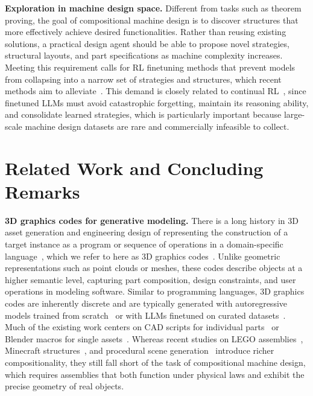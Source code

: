 \documentclass{article} %
\theoremstyle{plain}
\theoremstyle{definition}
\begin{document}
\textbf{Exploration in machine design space.} Different from tasks such as theorem proving, the goal of compositional machine design is to discover structures that more effectively achieve desired functionalities. Rather than reusing existing solutions, a practical design agent should be able to propose novel strategies, structural layouts, and part specifications as machine complexity increases. Meeting this requirement calls for RL finetuning methods that prevent models from collapsing into a narrow set of strategies and structures, which recent methods aim to alleviate~\citep{zhu2025flowrl,chen2025pass, cui2025entropy,cheng2025reasoning,liu2025nablagfn}. This demand is closely related to continual RL~\citep{schwarz2018progress}, since finetuned LLMs must avoid catastrophic forgetting, maintain its reasoning ability, and consolidate learned strategies, which is particularly important because large-scale machine design datasets are rare and commercially infeasible to collect.


\vspace{-1mm}
\section{Related Work and Concluding Remarks} 
\vspace{-1mm}

\textbf{3D graphics codes for generative modeling.} There is a long history in 3D asset generation and engineering design of representing the construction of a target instance as a program or sequence of operations in a domain-specific language~\citep{ritchie2023neurosymbolic,sun20253d,deng2022unsupervised}, which we refer to here as 3D graphics codes~\citep{qiu2025sgpbench, chen2025symbolic}. Unlike geometric representations such as point clouds or meshes, these codes describe objects at a higher semantic level, capturing part composition, design constraints, and user operations in modeling software. 
Similar to programming languages, 3D graphics codes are inherently discrete and are typically generated with autoregressive models trained from scratch~\citep{yuan2024cadtalk} or with LLMs finetuned on curated datasets~\citep{kulits2025re,chen2025sar3d}. Much of the existing work centers on CAD scripts for individual parts~\citep{wu2023cad, alrashedy2025generating,li2025cad} or Blender macros for single assets~\citep{huang2024blenderalchemy}. Whereas recent studies on LEGO assemblies~\citep{pun2025generating}, Minecraft structures~\citep{fan2022minedojo,liu2024odyssey}, and procedural scene generation~\citep{sun20253d,chen2025symbolic,jones2025shapelib,yuan2024cadtalk} introduce richer compositionality, they still fall short of the task of compositional machine design, which requires assemblies that both function under physical laws and exhibit the precise geometry of real objects.
\end{document}
